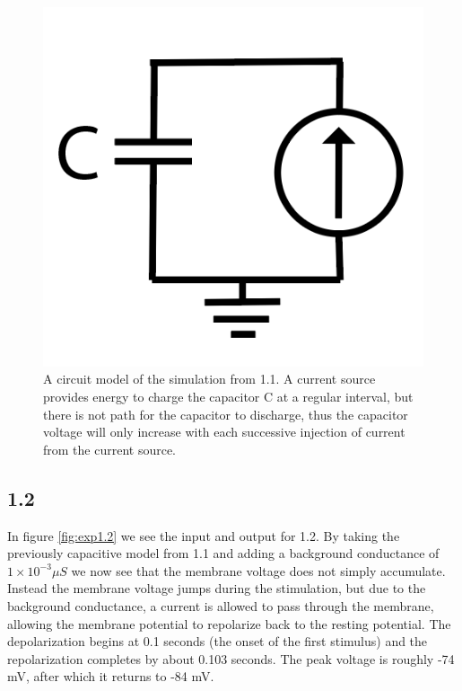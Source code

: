\documentclass[11pt]{article}
\begin{document}
\begin{figure}[H]
	\centering
	\centering
	\includegraphics[width = .5\textwidth]{Capacitive.png}
	
	\caption{A circuit model of the simulation from 1.1. A current source provides energy to charge the capacitor C at a regular interval, but there is not path for the capacitor to discharge, thus the capacitor voltage will only increase with each successive injection of current from the current source. }
	\label{fig:exp1.cmodel}
\end{figure}	


\subsection{1.2}
\par{}
In figure \ref{fig:exp1.2} we see the input and output for 1.2. By taking the previously capacitive model from 1.1 and adding a background conductance of \ensuremath{1\times{}10^{-3}\mu S} we now see that the membrane voltage does not simply accumulate. Instead the membrane voltage jumps during the stimulation, but due to the background conductance, a current is allowed to pass through the membrane, allowing the membrane potential to repolarize back to the resting potential. The depolarization begins at 0.1 seconds (the onset of the first stimulus) and the repolarization completes by about 0.103 seconds. The peak voltage is roughly -74 mV, after which it returns to -84 mV.
\end{document}

